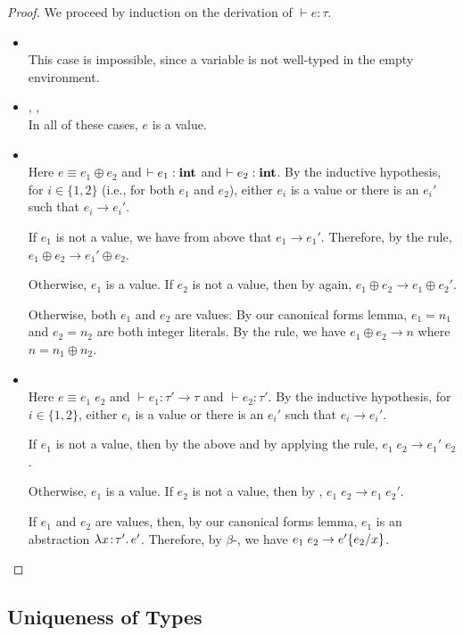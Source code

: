 \begin{proof}
We proceed by induction on the derivation of $\vdash e : \tau$.
\begin{itemize}
\item {}\\
This case is impossible, since a variable is not well-typed in the empty environment.

\item {}, , \\
In all of these cases, $e$ is a value.

\item {}\\
Here $e \equiv e_1 \oplus e_2$ and $\vdash e_1 : \mathbf{int}$ and $\vdash e_2 : \mathbf{int}$. By the inductive hypothesis, for $i \in \{1,2\}$ (i.e., for both $e_1$ and $e_2$), either $e_i$ is a value or there is an $e_i'$ such that $e_i \to e_i'$.

If $e_1$ is not a value, we have from above that $e_1 \to e_1'$. Therefore, by the  rule, $e_1 \oplus e_2 \to e_1' \oplus e_2$.

Otherwise, $e_1$ is a value. If $e_2$ is not a value, then by  again, $e_1 \oplus e_2 \to e_1 \oplus e_2'$.

Otherwise, both $e_1$ and $e_2$ are values. By our canonical forms lemma, $e_1 = n_1$ and $e_2 = n_2$ are both integer literals. By the  rule, we have $e_1 \oplus e_2 \to n$ where $n = n_1 \oplus n_2$.

\item {}\\
Here $e \equiv e_1\; e_2$ and $\vdash e_1 : \tau' \to \tau$ and $\vdash e_2 : \tau'$. By the inductive hypothesis, for $i \in \{1,2\}$, either $e_i$ is a value or there is an $e_i'$ such that $e_i \to e_i'$.

If $e_1$ is not a value, then by the above and by applying the  rule, $e_1\; e_2 \to e_1'\; e_2$.

Otherwise, $e_1$ is a value. If $e_2$ is not a value, then by , $e_1\; e_2 \to e_1\; e_2'$.

If $e_1$ and $e_2$ are values, then, by our canonical forms lemma, $e_1$ is an abstraction $\lambda x\!:\!\tau'.\, e'$. Therefore, by $\beta$-, we have $e_1\; e_2 \to e'\{e_2/x\}$.
\end{itemize}
\end{proof}

\subsection{Uniqueness of Types}

